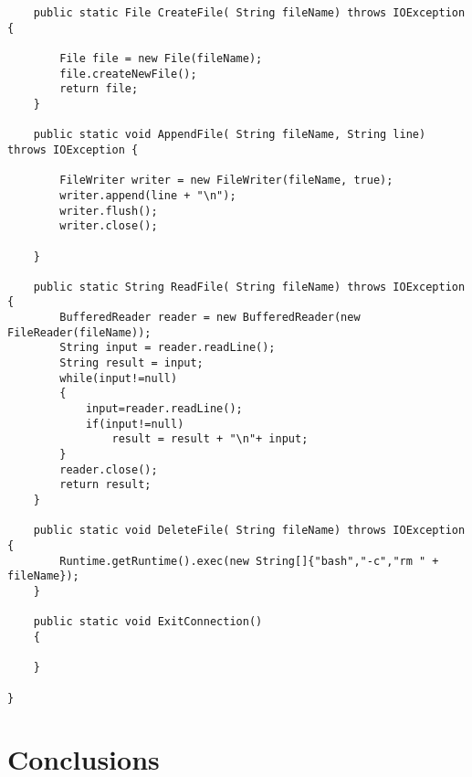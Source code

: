 \documentclass{article}
\begin{document}
\begin{lstlisting}
	public static File CreateFile( String fileName) throws IOException {
		
		File file = new File(fileName);
		file.createNewFile();
		return file;
	}

	public static void AppendFile( String fileName, String line) throws IOException {

		FileWriter writer = new FileWriter(fileName, true);
		writer.append(line + "\n");
		writer.flush();
		writer.close();
		
	}
	
	public static String ReadFile( String fileName) throws IOException {
		BufferedReader reader = new BufferedReader(new FileReader(fileName));
		String input = reader.readLine();
		String result = input;
		while(input!=null)
		{
			input=reader.readLine();
			if(input!=null)
				result = result + "\n"+ input;
		}
		reader.close();
		return result;
	}

	public static void DeleteFile( String fileName) throws IOException {
		Runtime.getRuntime().exec(new String[]{"bash","-c","rm " + fileName});
	}
	
	public static void ExitConnection()
	{
		
	}

}
		\end{lstlisting}
\section{Conclusions}	
\lipsum[42]

\end{document}

